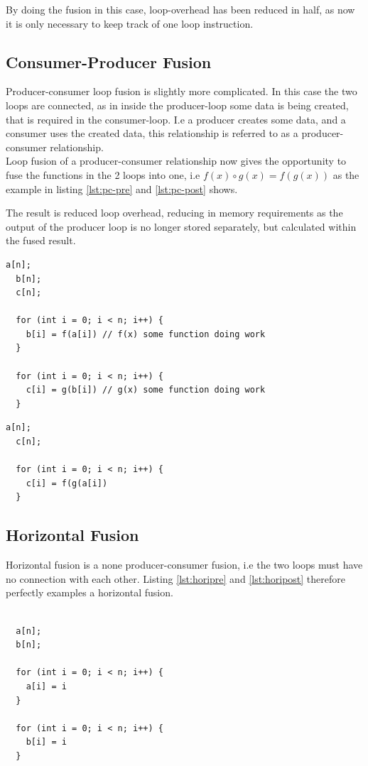 \documentclass[11pt]{article}
\begin{document}
By doing the fusion in this case, loop-overhead has been reduced in half, as now it is only necessary to keep track of one loop instruction.

\subsection{Consumer-Producer Fusion}
Producer-consumer loop fusion is slightly more complicated. In this case the two loops are connected, as in inside the producer-loop some data is being created, that is required in the consumer-loop. I.e a producer creates some data, and a consumer uses the created data, this relationship is referred to as a producer-consumer relationship. \\
Loop fusion of a producer-consumer relationship now gives the opportunity to fuse the functions in the 2 loops into one, i.e $f(x) \circ g(x) = f(g(x))$ as the example in listing \ref{lst:pc-pre} and \ref{lst:pc-post} shows. 

The result is reduced loop overhead, reducing in memory requirements as the output of the producer loop is no longer stored separately, but calculated within the fused result.

\begin{lstlisting}[caption=Producer-Consumer pre-fusion.,label={lst:pc-pre}] 
  a[n];
  b[n];
  c[n];
  	  
  for (int i = 0; i < n; i++) {
    b[i] = f(a[i]) // f(x) some function doing work  
  }
  
  for (int i = 0; i < n; i++) {
    c[i] = g(b[i]) // g(x) some function doing work
  }
\end{lstlisting}

\begin{lstlisting}[caption=Producer-Consumer post-fusion.,label={lst:pc-post}] 
  a[n];
  c[n];
  	  
  for (int i = 0; i < n; i++) {
    c[i] = f(g(a[i])
  }
\end{lstlisting}

\subsection{Horizontal Fusion}
Horizontal fusion is a none producer-consumer fusion, i.e the two loops must have no connection with each other. Listing \ref{lst:horipre} and \ref{lst:horipost} therefore perfectly examples a horizontal fusion.  
\begin{lstlisting}[caption=Pre-fusion,label={lst:horipre}]

  a[n];
  b[n];

  for (int i = 0; i < n; i++) {
    a[i] = i
  }

  for (int i = 0; i < n; i++) {
    b[i] = i
  }
\end{lstlisting}
\end{document}
